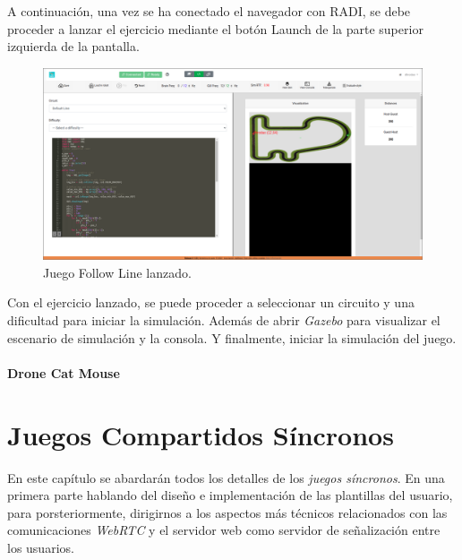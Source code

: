 \documentclass[a4paper, 12pt]{book}
\begin{document}
A continuación, una vez se ha conectado el navegador con RADI, se debe proceder a lanzar el ejercicio mediante el botón Launch de la parte superior izquierda de la pantalla.

\begin{figure}[H]
	\centering
    \includegraphics[width=15cm]{img/fl_connection_established.png}
    \caption{Juego Follow Line lanzado.}
    \label{figura:evaluator_drone}
\end{figure}

Con el ejercicio lanzado, se puede proceder a seleccionar un circuito y una dificultad para iniciar la simulación. Además de abrir \emph{Gazebo} para visualizar el escenario de simulación y la consola. Y finalmente, iniciar la simulación del juego.


\subsubsection{Drone Cat Mouse}


\cleardoublepage
\chapter{Juegos Compartidos Síncronos}

En este capítulo se abardarán todos los detalles de los \emph{juegos síncronos}. En una primera parte hablando del diseño e implementación de las plantillas del usuario, para porsteriormente, dirigirnos a los aspectos más técnicos relacionados con las comunicaciones \emph{WebRTC} y el servidor web como servidor de señalización entre los usuarios.
\end{document}
